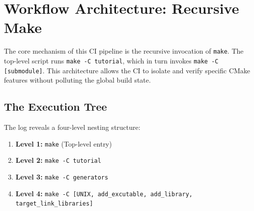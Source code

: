 \section{Workflow Architecture: Recursive Make}
The core mechanism of this CI pipeline is the recursive invocation of \texttt{make}. The top-level script runs \texttt{make -C tutorial}, which in turn invokes \texttt{make -C [submodule]}. This architecture allows the CI to isolate and verify specific CMake features without polluting the global build state.

\subsection{The Execution Tree}
The log reveals a four-level nesting structure:
\begin{enumerate}
    \item \textbf{Level 1:} \texttt{make} (Top-level entry)
    \item \textbf{Level 2:} \texttt{make -C tutorial}
    \item \textbf{Level 3:} \texttt{make -C generators}
    \item \textbf{Level 4:} \texttt{make -C [UNIX, add\_excutable, add\_library, target\_link\_libraries]}
\end{enumerate}

